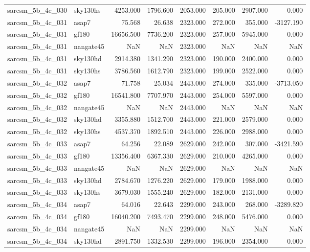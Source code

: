 \begin{tabular}{llrrrrrr}
sarcsm\_5b\_4c\_030 & sky130hs & 4253.000 & 1796.600 & 2053.000 & 205.000 & 2907.000 & 0.000 \\
sarcsm\_5b\_4c\_031 & asap7 & 75.568 & 26.638 & 2323.000 & 272.000 & 355.000 & -3127.190 \\
sarcsm\_5b\_4c\_031 & gf180 & 16656.500 & 7736.200 & 2323.000 & 257.000 & 5945.000 & 0.000 \\
sarcsm\_5b\_4c\_031 & nangate45 & NaN & NaN & 2323.000 & NaN & NaN & NaN \\
sarcsm\_5b\_4c\_031 & sky130hd & 2914.380 & 1341.290 & 2323.000 & 190.000 & 2400.000 & 0.000 \\
sarcsm\_5b\_4c\_031 & sky130hs & 3786.560 & 1612.790 & 2323.000 & 199.000 & 2522.000 & 0.000 \\
sarcsm\_5b\_4c\_032 & asap7 & 71.758 & 25.034 & 2443.000 & 274.000 & 335.000 & -3713.050 \\
sarcsm\_5b\_4c\_032 & gf180 & 16541.800 & 7707.970 & 2443.000 & 254.000 & 5597.000 & 0.000 \\
sarcsm\_5b\_4c\_032 & nangate45 & NaN & NaN & 2443.000 & NaN & NaN & NaN \\
sarcsm\_5b\_4c\_032 & sky130hd & 3355.880 & 1512.700 & 2443.000 & 221.000 & 2579.000 & 0.000 \\
sarcsm\_5b\_4c\_032 & sky130hs & 4537.370 & 1892.510 & 2443.000 & 226.000 & 2988.000 & 0.000 \\
sarcsm\_5b\_4c\_033 & asap7 & 64.256 & 22.089 & 2629.000 & 242.000 & 307.000 & -3421.590 \\
sarcsm\_5b\_4c\_033 & gf180 & 13356.400 & 6367.330 & 2629.000 & 210.000 & 4265.000 & 0.000 \\
sarcsm\_5b\_4c\_033 & nangate45 & NaN & NaN & 2629.000 & NaN & NaN & NaN \\
sarcsm\_5b\_4c\_033 & sky130hd & 2784.670 & 1276.220 & 2629.000 & 179.000 & 1988.000 & 0.000 \\
sarcsm\_5b\_4c\_033 & sky130hs & 3679.030 & 1555.240 & 2629.000 & 182.000 & 2131.000 & 0.000 \\
sarcsm\_5b\_4c\_034 & asap7 & 64.016 & 22.643 & 2299.000 & 243.000 & 268.000 & -3289.820 \\
sarcsm\_5b\_4c\_034 & gf180 & 16040.200 & 7493.470 & 2299.000 & 248.000 & 5476.000 & 0.000 \\
sarcsm\_5b\_4c\_034 & nangate45 & NaN & NaN & 2299.000 & NaN & NaN & NaN \\
sarcsm\_5b\_4c\_034 & sky130hd & 2891.750 & 1332.530 & 2299.000 & 196.000 & 2354.000 & 0.000 \\

\end{tabular}
